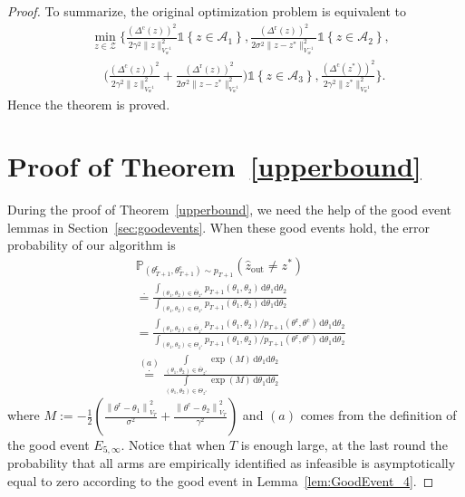 \documentclass[accepted]{uai2025} %
\theoremstyle{plain}
\theoremstyle{definition}
\theoremstyle{remark}
\newcommand{\thetac}{\theta^{\mathrm{c}}}
\newcommand{\Deltac}{\Delta^{\mathrm{c}}}
\newcommand{\Deltar}{\Delta^{\mathrm{r}}}
\newcommand{\thetar}{\theta^{\mathrm{r}}}
\newcommand{\truethetac}{\theta^{\mathrm{c}}}
\newcommand{\truethetar}{\theta^{\mathrm{r}}}
\newcommand{\cbr}[1]{\left\{#1\right\}}
\newcommand*{\one}{\mathds{1}}
\begin{document}
\begin{proof}
To summarize, the original optimization problem is equivalent to 
\begin{align*}
    &\min_{z\in \mathcal{Z}} \bigg\{ \frac{(\Deltac(z))^2}{2\gamma^2\lVert z\rVert^2_{V_w^{-1}}} \one \cbr{z\in \mathcal{A}_1}, 
    \frac{(\Deltar(z))^2}{2\sigma^2\lVert z-z^* \rVert^2_{V_w^{-1}}} \one \cbr{z\in \mathcal{A}_2}, 
    \\& \quad \bigg( \frac{(\Deltac(z))^2}{2\gamma^2\lVert z\rVert^2_{V_w^{-1}}}+\frac{(\Deltar(z))^2}{2\sigma^2\lVert z-z^*\rVert^2_{V_w^{-1}}}\bigg) \one \cbr{z\in \mathcal{A}_3},
   \frac{(\Deltac(z^*))^2}{2\gamma^2\lVert z^*\rVert^2_{V_w^{-1}}}\bigg\}.
\end{align*}
Hence the theorem is proved.

\section{Proof of Theorem~\ref{upperbound}}
During the proof of Theorem~\ref{upperbound}, we need the help of the good event lemmas in Section~\ref{sec:goodevents}. When these good events hold, the error probability of our algorithm is
\begin{align*}  &\mathbb{P}_{(\thetar_{T+1},\thetac_{T+1})\sim p_{T+1}} (\hat{z}_\text{{out}} \neq z^*)
\\&\stackrel{\cdot}{=}\frac{\int_{(\theta_1,\theta_2)\in \overline{\Theta}_{z^*}}p_{T+1}(\theta_1,\theta_2)\,\mathrm{d}\theta_1\mathrm{d}\theta_2}{\int_{(\theta_1,\theta_2)\in {\Theta}_{z^*}}p_{T+1}(\theta_1,\theta_2)\,\mathrm{d}\theta_1\mathrm{d}\theta_2}
\\&=\frac{\int_{(\theta_1,\theta_2)\in \overline{\Theta}_{z^*}}p_{T+1}(\theta_1,\theta_2)/p_{T+1}(\thetar,\thetac)\,\mathrm{d}\theta_1\mathrm{d}\theta_2}{\int_{(\theta_1,\theta_2)\in {\Theta}_{z^*}}p_{T+1}(\theta_1,\theta_2)/p_{T+1}(\thetar,\thetac)\,\mathrm{d}\theta_1\mathrm{d}\theta_2}
\\&\stackrel{(a)}{\stackrel{\cdot}{=}}\frac{\int\limits_{(\theta_1,\theta_2)\in \overline{\Theta}_{z^*}} \exp \left( M\right)\,\mathrm{d}\theta_1\mathrm{d}\theta_2}{\int\limits_{(\theta_1,\theta_2)\in {\Theta}_{z^*}}\exp \left( M\right)\,\mathrm{d}\theta_1\mathrm{d}\theta_2}
\end{align*}
where $M:=-\frac{1}{2} \left( 
\frac{\left\| \truethetar - \theta_1 \right\|^2_{{V}_T}}{\sigma^2} 
+ \frac{\left\| \truethetac - \theta_2 \right\|^2_{{V}_T}}{\gamma^2} 
\right) $ and $(a)$ comes from the definition of the good event $E_{5,\infty}$. Notice that when $T$ is enough large, at the last round the probability that all arms are empirically identified as infeasible is asymptotically equal to zero according to the good event in Lemma~\ref{lem:GoodEvent_4}.

\end{proof}
\end{document}
